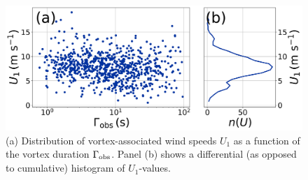 \documentclass[linenumbers,trackchanges]{aastex63}
\begin{document}

\begin{figure}
    \centering
    \includegraphics[width=\textwidth]{figures/U1_vs_Gamma_hist.png}
    \caption{(a) Distribution of vortex-associated wind speeds $U_1$ as a function of the vortex duration $\Gamma_{\rm obs}$. Panel (b) shows a differential (as opposed to cumulative) histogram of $U_1$-values.}
    \label{fig:U1_vs_Gamma_hist}
\end{figure}
\end{document}
